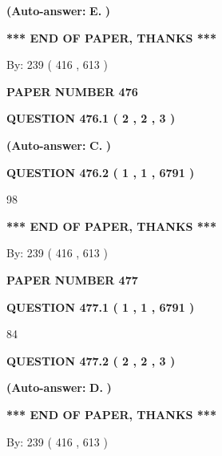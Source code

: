 \documentclass{ctexart}
\begin{document}
 
{\textbf{(Auto-answer:}}
{\textbf{\large{
E.}}}
{\textbf{)}}
 
 
   
   
   
   
\vspace{1.0in} 
{\textbf{\large{ *** END OF PAPER, THANKS *** }}} 
   
   
\hspace{1.0in} By: 
 239 ( 416 ,  613 )
   
   
   
   
\newpage 
\setcounter{page}{ 
   476001 } 
   
   
 {\textbf{ \Large{ PAPER NUMBER  476  }}}
   
   
   
   
  
  
{\textbf{\large{QUESTION
476.1 
 ( 2 , 2 , 3 )
}}}
 
 
{\textbf{(Auto-answer:}}
{\textbf{\large{
C.}}}
{\textbf{)}}
 
 
  
  
{\textbf{\large{QUESTION
476.2 
 ( 1 , 1 , 6791 )
}}}

98
   
   
   
   
\vspace{1.0in} 
{\textbf{\large{ *** END OF PAPER, THANKS *** }}} 
   
   
\hspace{1.0in} By: 
 239 ( 416 ,  613 )
   
   
   
   
\newpage 
\setcounter{page}{ 
   477001 } 
   
   
 {\textbf{ \Large{ PAPER NUMBER  477  }}}
   
   
   
   
  
  
{\textbf{\large{QUESTION
477.1 
 ( 1 , 1 , 6791 )
}}}

84
  
  
{\textbf{\large{QUESTION
477.2 
 ( 2 , 2 , 3 )
}}}
 
 
{\textbf{(Auto-answer:}}
{\textbf{\large{
D.}}}
{\textbf{)}}
 
 
   
   
   
   
\vspace{1.0in} 
{\textbf{\large{ *** END OF PAPER, THANKS *** }}} 
   
   
\hspace{1.0in} By: 
 239 ( 416 ,  613 )
   
   
   
\end{document}
